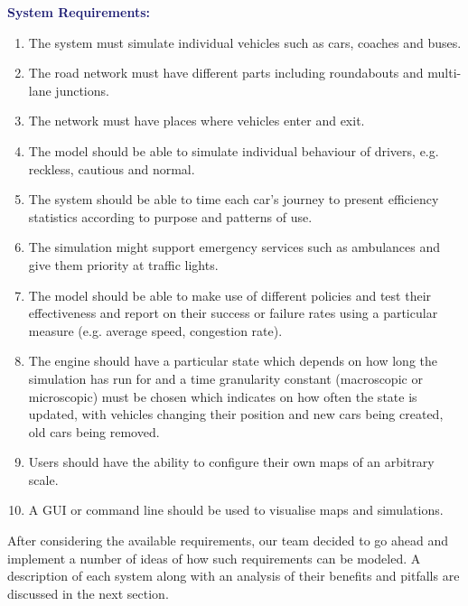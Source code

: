 \documentclass{article}
\begin{document}
{\bf\textcolor{MidnightBlue}{System Requirements:}}
\begin{enumerate}
	
	\item The system must simulate individual vehicles such as cars, coaches and buses.
	\item The road network must have different parts including roundabouts and multi-lane junctions. 
	\item The network must have places where vehicles enter and exit.
	\item The model should be able to simulate individual behaviour of drivers, e.g. reckless, cautious and normal. 
	\item The system should be able to time each car's journey to present efficiency statistics according to purpose and patterns of use. 
	\item The simulation might support emergency services such as ambulances and give them priority at traffic lights.
	\item The model should be able to make use of different policies and test their effectiveness and report on their success or failure rates using a particular measure (e.g. average speed, congestion rate).
	\item The engine should have a particular state which depends on how long the simulation has run for and a time granularity constant (macroscopic or microscopic) must be chosen which indicates on how often the state is updated, with vehicles changing their position and new cars being created, old cars being removed.  
	\item Users should have the ability to configure their own maps of an arbitrary scale. 
	\item A GUI or command line should be used to visualise maps and simulations.
\end{enumerate}

\noindent
After considering the available requirements, our team decided to go ahead and implement a number of ideas of how such requirements can be modeled. 
A description of each system along with an analysis of their benefits and pitfalls are discussed in the next section. 
\end{document}
